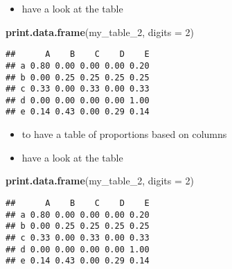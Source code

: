 \documentclass[
]{article}
\newenvironment{Shaded}{\begin{snugshade}}{\end{snugshade}}
\newcommand{\DataTypeTok}[1]{\textcolor[rgb]{0.13,0.29,0.53}{#1}}
\newcommand{\DecValTok}[1]{\textcolor[rgb]{0.00,0.00,0.81}{#1}}
\newcommand{\KeywordTok}[1]{\textcolor[rgb]{0.13,0.29,0.53}{\textbf{#1}}}
\newcommand{\NormalTok}[1]{#1}
\newcommand{\OperatorTok}[1]{\textcolor[rgb]{0.81,0.36,0.00}{\textbf{#1}}}
\newcommand{\StringTok}[1]{\textcolor[rgb]{0.31,0.60,0.02}{#1}}
\providecommand{\tightlist}{%
  \setlength{\itemsep}{0pt}\setlength{\parskip}{0pt}}
\begin{document}
\begin{itemize}
\tightlist
\item
  have a look at the table
\end{itemize}

\begin{Shaded}
\begin{Highlighting}[]
\KeywordTok{print.data.frame}\NormalTok{(my_table_}\DecValTok{2}\NormalTok{, }\DataTypeTok{digits =} \DecValTok{2}\NormalTok{)}
\end{Highlighting}
\end{Shaded}

\begin{verbatim}
##      A    B    C    D    E
## a 0.80 0.00 0.00 0.00 0.20
## b 0.00 0.25 0.25 0.25 0.25
## c 0.33 0.00 0.33 0.00 0.33
## d 0.00 0.00 0.00 0.00 1.00
## e 0.14 0.43 0.00 0.29 0.14
\end{verbatim}

\begin{itemize}
\tightlist
\item
  to have a table of proportions based on columns
\end{itemize}

\begin{Shaded}
\end{Shaded}

\begin{itemize}
\tightlist
\item
  have a look at the table
\end{itemize}

\begin{Shaded}
\begin{Highlighting}[]
\KeywordTok{print.data.frame}\NormalTok{(my_table_}\DecValTok{2}\NormalTok{, }\DataTypeTok{digits =} \DecValTok{2}\NormalTok{)}
\end{Highlighting}
\end{Shaded}

\begin{verbatim}
##      A    B    C    D    E
## a 0.80 0.00 0.00 0.00 0.20
## b 0.00 0.25 0.25 0.25 0.25
## c 0.33 0.00 0.33 0.00 0.33
## d 0.00 0.00 0.00 0.00 1.00
## e 0.14 0.43 0.00 0.29 0.14
\end{verbatim}
\end{document}
